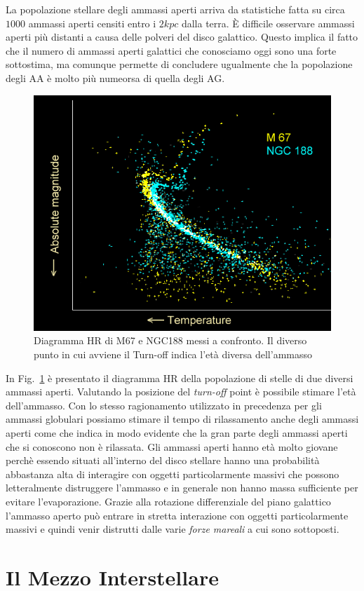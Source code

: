 La popolazione stellare degli ammassi aperti arriva da statistiche fatta su circa $1000$ ammassi aperti censiti entro i $2kpc$ dalla terra. \`E difficile osservare ammassi aperti pi\`u distanti a causa delle polveri del disco galattico. Questo implica il fatto che il numero di ammassi aperti galattici che conosciamo oggi sono una forte sottostima, ma comunque permette di concludere ugualmente che la popolazione degli AA \`e molto pi\`u numeorsa di quella degli AG.
\begin{figure}
		\centering
		\includegraphics[scale=0.4]{turnM67.png}
		\caption{Diagramma HR di M67 e NGC188 messi a confronto. Il diverso punto in cui avviene il Turn-off indica l'et\`a diversa dell'ammasso}
		\label{ETA:AA}
\end{figure}

In Fig.~\ref{ETA:AA} \`e presentato il diagramma HR della popolazione di stelle di due diversi ammassi aperti. Valutando la posizione del \emph{turn-off} point \`e possibile stimare l'et\`a dell'ammasso. Con lo stesso ragionamento utilizzato in precedenza per gli ammassi globulari possiamo stimare il tempo di rilassamento anche degli ammassi aperti come
che indica in modo evidente che la gran parte degli ammassi aperti che si conoscono non \`e rilassata.
Gli ammassi aperti hanno et\`a molto giovane perch\`e essendo situati all'interno del disco stellare hanno una probabilit\`a abbastanza alta di interagire con oggetti particolarmente massivi che possono letteralmente distruggere l'ammasso e in generale non hanno massa sufficiente per evitare l'evaporazione. Grazie alla rotazione differenziale del piano galattico l'ammasso aperto pu\`o entrare in stretta interazione con oggetti particolarmente massivi e quindi venir distrutti dalle varie \emph{forze mareali} a cui sono sottoposti.
\section{Il Mezzo Interstellare}
















